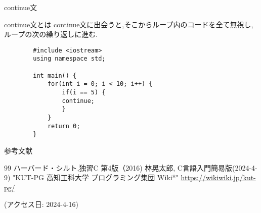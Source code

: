 \documentclass[xdvipdfmx, 8pt, t]{beamer}
\begin{document}
\begin{frame}[fragile]{continue文}
\begin{block}{continue文とは}
    continue文に出会うと,そこからループ内のコードを全て無視し,ループの次の繰り返しに進む.
\end{block}
    \begin{lstlisting}
        #include <iostream>
        using namespace std;

        int main() {
            for(int i = 0; i < 10; i++) {
                if(i == 5) {
                continue;
                }
            }
            return 0;
        }
    \end{lstlisting}
\end{frame}


\begin{frame}{参考文献}
    \begin{thebibliography} {99}
    ハーバード・シルト,独習C 第4版（2016)
    林晃太郎, C言語入門簡易版(2024-4-9)
    "KUT-PG 高知工科大学 プログラミング集団 Wiki*"
    \url{https://wikiwiki.jp/kut-pg/}
    
    (アクセス日: 2024-4-16)
    \end{thebibliography}
\end{frame}
\end{document}

